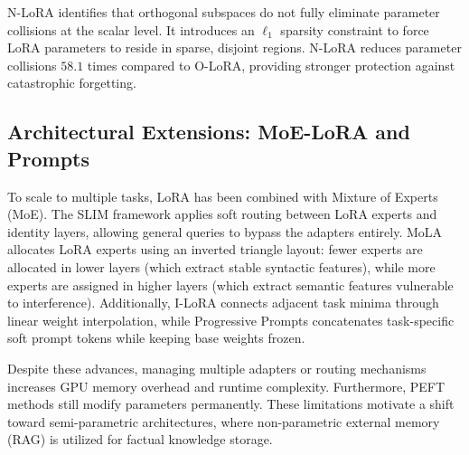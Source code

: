 N-LoRA \parencite{yang2024parametercollisionhinderingcontinual} identifies that orthogonal subspaces do not fully eliminate parameter collisions at the scalar level. It introduces an $\ell_1$ sparsity constraint to force LoRA parameters to reside in sparse, disjoint regions. N-LoRA reduces parameter collisions $58.1$ times compared to O-LoRA, providing stronger protection against catastrophic forgetting.

\subsection{Architectural Extensions: MoE-LoRA and Prompts}
To scale to multiple tasks, LoRA has been combined with Mixture of Experts (MoE). The SLIM framework \parencite{han-etal-2025-slim} applies soft routing between LoRA experts and identity layers, allowing general queries to bypass the adapters entirely. MoLA \parencite{gao2024higherlayersneedlora} allocates LoRA experts using an inverted triangle layout: fewer experts are allocated in lower layers (which extract stable syntactic features), while more experts are assigned in higher layers (which extract semantic features vulnerable to interference). Additionally, I-LoRA \parencite{ren2024analyzingreducingcatastrophicforgetting} connects adjacent task minima through linear weight interpolation, while Progressive Prompts \parencite{razdaibiedina2023progressivepromptscontinuallearning} concatenates task-specific soft prompt tokens while keeping base weights frozen.

Despite these advances, managing multiple adapters or routing mechanisms increases GPU memory overhead and runtime complexity. Furthermore, PEFT methods still modify parameters permanently. These limitations motivate a shift toward semi-parametric architectures, where non-parametric external memory (RAG) is utilized for factual knowledge storage.

